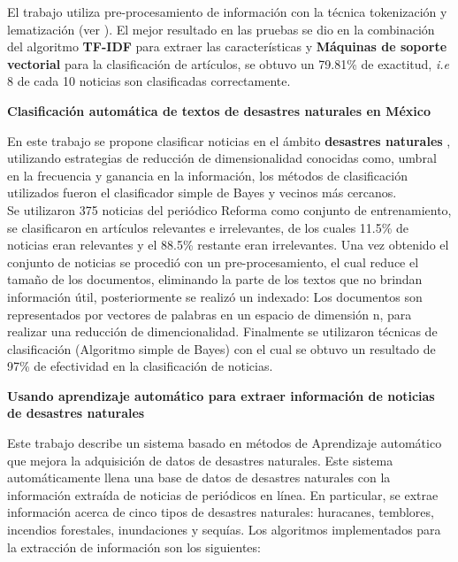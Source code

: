 El trabajo utiliza  pre-procesamiento de información con la técnica tokenización y lematización (ver ). El mejor resultado en las pruebas se dio en la combinación del algoritmo \textbf{TF-IDF} para extraer las características y \textbf{Máquinas de soporte vectorial} para la clasificación de artículos, se obtuvo un 79.81\% de exactitud, \textit{i.e} 8 de cada 10 noticias son clasificadas correctamente.\\



\begin{large}
	 \textbf{Clasificación automática de textos de desastres naturales en México}\\
\end{large}

En este trabajo se propone clasificar noticias en el ámbito \textbf{desastres naturales} \citep{CD9}, utilizando estrategias de reducción de dimensionalidad conocidas como, umbral en la frecuencia y ganancia en la información, los métodos de clasificación utilizados fueron el clasificador simple de Bayes y vecinos más cercanos.\\

Se utilizaron 375 noticias del periódico Reforma como conjunto de entrenamiento, se clasificaron en artículos relevantes e irrelevantes, de los cuales 11.5\% de noticias eran relevantes y el 88.5\% restante eran irrelevantes. Una vez obtenido el conjunto de noticias se procedió con un pre-procesamiento, el cual reduce el tamaño de los documentos, eliminando la parte de los textos que no brindan información útil, posteriormente se realizó un indexado: Los documentos son representados por vectores de palabras en un espacio de dimensión n, para realizar una reducción de dimencionalidad. Finalmente se utilizaron técnicas de clasificación (Algoritmo simple de Bayes) con el cual se obtuvo un resultado de 97\% de efectividad en la clasificación de noticias.\\



\begin{large}
	 \textbf{Usando aprendizaje automático para extraer información de noticias de desastres naturales}\\
\end{large}


Este trabajo describe un sistema basado en métodos de Aprendizaje automático que mejora la adquisición de datos de desastres naturales\citep{CD11}. Este sistema automáticamente llena una base de datos de desastres naturales con la información extraída de noticias de periódicos en línea. En particular, se extrae información acerca de cinco tipos de desastres naturales: huracanes, temblores, incendios forestales, inundaciones y sequías. Los algoritmos implementados para la extracción de información son los siguientes: 

